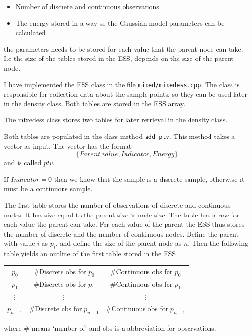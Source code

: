 \documentclass[10pt, journal, compsocconf,a4paper]{IEEEtran}
\begin{document}
\begin{itemize}
  \item Number of discrete and continuous observations
  \item The energy stored in a way so the Gaussian model parameters can be calculated
\end{itemize}
the parameters needs to be stored for each value that the parent node can take. I.e the size of the tables stored in the ESS, depends on the size of the parent node.

I have implemented the ESS class in the file \texttt{mixed/mixedess.cpp}. The class is responsible for collection data about the sample points, so they can be used later in the density class. Both tables are stored in the ESS array.

The mixedess class stores two tables for later retrieval in the density class. 

Both tables are populated in the class method \texttt{add\_ptv}. This method takes a vector as input. The vector has the format
\begin{equation}
  \{Parent\ value, Indicator, Energy\}
\end{equation}
and is called \emph{ptv}.


If $Indicator=0$ then we know that the sample is a discrete sample, otherwise it must be a continuous sample.

The first table stores the number of observations of discrete and continuous nodes. It has size equal to the parent size $\times$ node size. The table has a row for each value the parent can take. For each value of the parent the ESS thus stores the number of discrete and the number of continuous nodes. Define the parent with value $i$ as $p_i$, and define the size of the parent node as $n$. Then the following table yields an outline of the first table stored in the ESS
\begin{center}
  \begin{tabular}{c | c | c}
  $p_0$ & \#Discrete obs for $p_0$ & \#Continuous obs for $p_0$ \\
  $p_1$ & \#Discrete obs for $p_1$ & \#Continuous obs for $p_1$ \\
  \vdots & \vdots & \vdots \\
  $p_{n-1}$ & \#Discrete obs for $p_{n-1}$ & \#Continuous obs for $p_{n-1}$ 
  \end{tabular}  
\end{center}
where \# means `number of' and obs is a abbreviation for observations.
\end{document}
